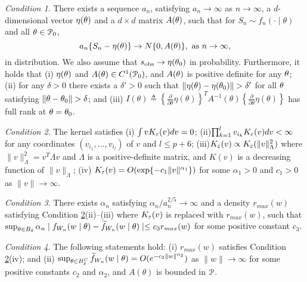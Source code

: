 \documentclass[9pt]{article}
\theoremstyle{remark}
\newtheorem{condition}{Condition}
\begin{document}
\begin{condition} \label{sum_conv}
	There exists a sequence $a_{n}$, satisfying $a_{n}\rightarrow\infty$
	as $n\rightarrow\infty$, a $d$-dimensional vector $\eta({}{\theta})$
	and a $d\times d$ matrix $A({}{\theta})$, such that for $S_{n}\sim f_{n}(\cdot\mid\theta)$
	and all ${}{\theta}\in\mathcal{P}_{0}$, 
	\[
	a_{n}\{{}{S}_{n}-\eta({}{\theta})\}\rightarrow N\{0,A({}{\theta})\},\mbox{ as \ensuremath{n\rightarrow\infty}},
	\]
	in distribution. We also assume that ${}{s}_{\rm obs}\rightarrow\eta({}{\theta}_{0})$
	in probability. Furthermore, it holds that (i) $\eta({}{\theta})$
	and $A({}{\theta})\in C^{1}(\mathcal{P}_{0})$, and $A({}{\theta})$ is
	positive definite for any ${}{\theta}$; (ii) for any $\delta>0$ there
	exists a $\delta'>0$ such that $\|\eta(\btheta)-\eta(\btheta_{0})\|>\delta'$
	for all ${}{\theta}$ satisfying $\|\btheta-\btheta_{0}\|>\delta$; and
	(iii) $I(\theta)\triangleq\left\{ \frac{\partial}{\partial\theta}\eta(\theta)\right\} ^{T}A^{-1}(\theta)\left\{ \frac{\partial}{\partial\theta}\eta(\theta)\right\} $
	has full rank at ${}{\theta}={}{\theta}_{0}$.
\end{condition}

\begin{condition} \label{kernel_prop}
	The kernel satisfies (i) $\int vK_{\varepsilon}(v)dv=0$; (ii)$\prod_{k=1}^{l}v_{i_{k}}K_{\varepsilon}(v)dv<\infty$
	for any coordinates $(v_{i_{1}},\dots,v_{i_{l}})$ of $v$ and $l\leq p+6$;
	(iii)$K_{\varepsilon}(v)\propto K_{\varepsilon}(\|v\|_{\Lambda}^{2})$ where $\|v\|_{\Lambda}^{2}=v^{T}\Lambda v$
	and $\Lambda$ is a positive-definite matrix, and $K(v)$ is a decreasing
	function of $\|v\|_{\Lambda}$; (iv) $K_{\varepsilon}(v)=O(\exp\{-c_{1}\|v\|^{\alpha_{1}}\})$
	for some $\alpha_{1}>0$ and $c_{1}>0$ as $\|v\|\rightarrow\infty$. 
\end{condition}

\begin{condition} \label{sum_approx}
	There exists $\alpha_{n}$ satisfying $\alpha_{n}/a_{n}^{2/5}\rightarrow\infty$
	and a density $r_{max}(w)$ satisfying Condition \ref{kernel_prop}(ii)--(iii) where $K_{\varepsilon}(v)$
	is replaced with $r_{max}(w)$, such that $\sup_{\theta\in B_{\delta}}\alpha_{n}\mid f_{W_{n}}(w\mid\theta)-\widetilde{f}_{W_{n}}(w\mid\theta)\mid\leq c_{3}r_{max}(w)$
	for some positive constant $c_{3}$. 
\end{condition}

\begin{condition} \label{sum_approx_tail}
	The following statements hold: (i) $r_{max}(w)$ satisfies
	Condition \ref{kernel_prop}(iv); and (ii) $\sup_{\theta\in B_{\delta}^{C}}\widetilde{f}_{W_{n}}(w\mid\theta)=O(e^{-c_{2}\|w\|^{\alpha_{2}}})$
	as $\|w\|\rightarrow\infty$ for some positive constants $c_{2}$
	and $\alpha_{2}$, and $A(\theta)$ is bounded in ${\cal P}$. 
\end{condition}
\end{document}
